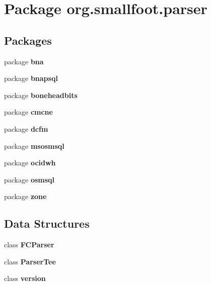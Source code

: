 \section{Package org.\+smallfoot.\+parser}
\label{namespaceorg_1_1smallfoot_1_1parser}
\subsection*{Packages}
\begin{DoxyCompactItemize}
\item 
package {\bf bna}
\item 
package {\bf bnapsql}
\item 
package {\bf boneheadbits}
\item 
package {\bf cmcne}
\item 
package {\bf dcfm}
\item 
package {\bf msosmsql}
\item 
package {\bf ocidwh}
\item 
package {\bf osmsql}
\item 
package {\bf zone}
\end{DoxyCompactItemize}
\subsection*{Data Structures}
\begin{DoxyCompactItemize}
\item 
class {\bf F\+C\+Parser}
\item 
class {\bf Parser\+Tee}
\item 
class {\bf version}
\end{DoxyCompactItemize}

